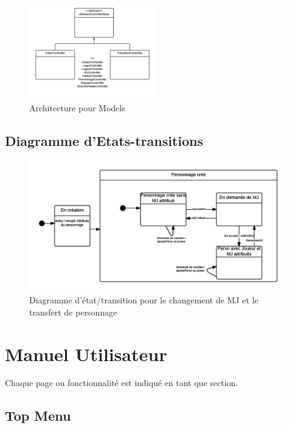 \documentclass[a4paper,oneside,10pt]{article}
\begin{document}
\begin{figure}[H]
	\begin{center}
		\includegraphics[width=0.49\textwidth]{images/logiciel/arch4.png}  
		\caption{Architecture pour Models}
	\end{center}
\end{figure}


\subsection{Diagramme d'Etats-transitions}
\begin{figure}[H]
	\begin{center}
		\includegraphics[width=\textwidth]{images/sequence/ET-Personnage.png}  
		\caption{Diagramme d'état/transition pour le changement de MJ et le transfert de personnage}
	\end{center}
\end{figure}

\pagebreak

\section{Manuel Utilisateur}

Chaque page ou fonctionnalité est indiqué en tant que section. 

\subsection{Top Menu}
\label{MUTopMenu}
\end{document}
